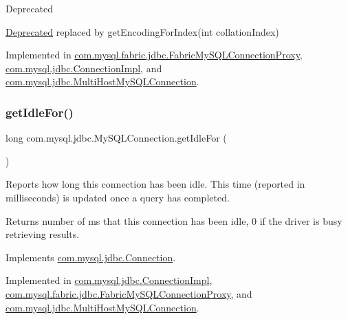 \begin{DoxyRefDesc}{Deprecated}
\item[\mbox{\hyperlink{deprecated__deprecated000015}{Deprecated}}]replaced by {\ttfamily get\+Encoding\+For\+Index(int collation\+Index)} \end{DoxyRefDesc}


Implemented in \mbox{\hyperlink{classcom_1_1mysql_1_1fabric_1_1jdbc_1_1_fabric_my_s_q_l_connection_proxy_a176bddbd723ed954ff3148d5c7fab2db}{com.\+mysql.\+fabric.\+jdbc.\+Fabric\+My\+S\+Q\+L\+Connection\+Proxy}}, \mbox{\hyperlink{classcom_1_1mysql_1_1jdbc_1_1_connection_impl_a2585f67a62bdf6127174e9f7dbc8a0b6}{com.\+mysql.\+jdbc.\+Connection\+Impl}}, and \mbox{\hyperlink{classcom_1_1mysql_1_1jdbc_1_1_multi_host_my_s_q_l_connection_a1f8af47fc87288b476e1fb532efecda0}{com.\+mysql.\+jdbc.\+Multi\+Host\+My\+S\+Q\+L\+Connection}}.

\mbox{\label{interfacecom_1_1mysql_1_1jdbc_1_1_my_s_q_l_connection_a835df16f7b2e35f0729ba560fd210a2a}} 
\subsubsection{\texorpdfstring{get\+Idle\+For()}{getIdleFor()}}
{\footnotesize\ttfamily long com.\+mysql.\+jdbc.\+My\+S\+Q\+L\+Connection.\+get\+Idle\+For (\begin{DoxyParamCaption}{ }\end{DoxyParamCaption})}

Reports how long this connection has been idle. This time (reported in milliseconds) is updated once a query has completed.

\begin{DoxyReturn}{Returns}
number of ms that this connection has been idle, 0 if the driver is busy retrieving results. 
\end{DoxyReturn}


Implements \mbox{\hyperlink{interfacecom_1_1mysql_1_1jdbc_1_1_connection_ae3e5825f1ce28db5688c14a0ddbd95f9}{com.\+mysql.\+jdbc.\+Connection}}.



Implemented in \mbox{\hyperlink{classcom_1_1mysql_1_1jdbc_1_1_connection_impl_a6d675106c9edd73d2472401cf33b82a8}{com.\+mysql.\+jdbc.\+Connection\+Impl}}, \mbox{\hyperlink{classcom_1_1mysql_1_1fabric_1_1jdbc_1_1_fabric_my_s_q_l_connection_proxy_a6e1ff3ab80b2c51f16f27c02ae9e25a8}{com.\+mysql.\+fabric.\+jdbc.\+Fabric\+My\+S\+Q\+L\+Connection\+Proxy}}, and \mbox{\hyperlink{classcom_1_1mysql_1_1jdbc_1_1_multi_host_my_s_q_l_connection_a599b45b496d131fc0a7e56c867bbb3b0}{com.\+mysql.\+jdbc.\+Multi\+Host\+My\+S\+Q\+L\+Connection}}.

